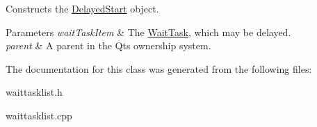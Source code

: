 Constructs the \hyperlink{class_delayed_start}{Delayed\+Start} object. 


\begin{DoxyParams}{Parameters}
{\em wait\+Task\+Item} & The \hyperlink{class_wait_task}{Wait\+Task}, which may be delayed. \\
\hline
{\em parent} & A parent in the Qt\textquotesingle{}s ownership system. \\
\hline
\end{DoxyParams}


The documentation for this class was generated from the following files\+:\begin{DoxyCompactItemize}
\item 
waittasklist.\+h\item 
waittasklist.\+cpp\end{DoxyCompactItemize}
